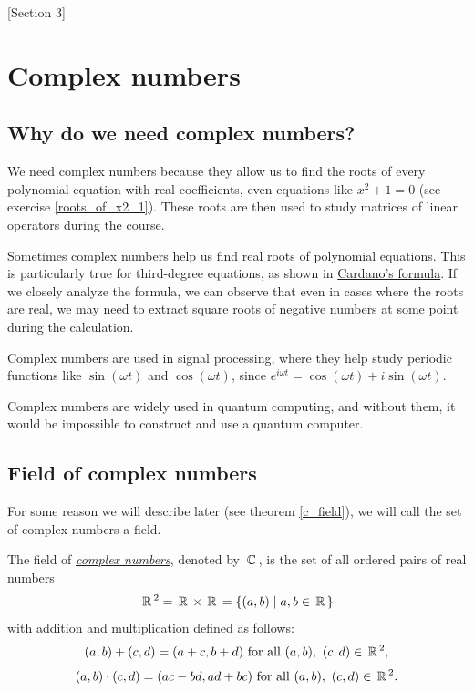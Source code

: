 [Section 3]

\newpage

\section{Complex numbers}
\subsection{Why do we need complex numbers?}

\begin{example}
We need complex numbers because they allow us to find the roots of every polynomial equation with real coefficients, even equations like $x^2 + 1 = 0$ (see exercise \ref{roots_of_x2_1}).  These roots are then used to study matrices of linear operators during the course.
\end{example}

\begin{example} Sometimes complex numbers help us find real roots of polynomial equations. This is particularly true for third-degree equations, as shown in \href{https://en.wikipedia.org/wiki/Cubic_equation#General_cubic_formula}{Cardano's formula}. If we closely analyze the formula, we can observe that even in cases where the roots are real, we may need to extract square roots of negative numbers at some point during the calculation.
\end{example}

\begin{example}
Complex numbers are used in signal processing, where they help study periodic functions like $\sin(\omega t)$ and $\cos(\omega t)$, since $e^{i\omega t} = \cos(\omega t) + i\sin(\omega t)$.
\end{example}

\begin{example}
Complex numbers are widely used in quantum computing, and without them, it would be impossible to construct and use a quantum computer.
\end{example}

\subsection{Field of complex numbers}

For some reason we will describe later (see theorem \ref{c_field}), we will call the set of complex numbers a field.

\begin{definition}\label{complex}
The field of \underline{\it complex numbers}, denoted by $\,\mathbb{C}\,$, is the set of all ordered pairs of real numbers
$$\,\mathbb{R}\,^2 = \,\mathbb{R}\,\times\,\mathbb{R}\, = \{(a,b) \mid a,b \in \,\mathbb{R}\,\}$$
with addition and multiplication defined as follows:
$$
(a, b)+(c, d)=(a+c, b+d)\text{ for all }(a, b),~(c, d) \in \,\mathbb{R}\,^2,$$
$$(a, b) \cdot(c, d)=(a c-b d, a d+b c)\text{ for all }(a, b),~(c, d) \in \,\mathbb{R}\,^2.$$
\end{definition}

